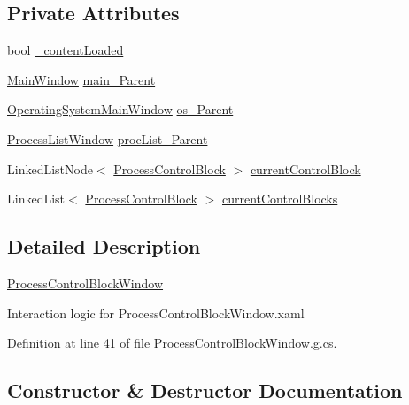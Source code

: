 \subsection*{Private Attributes}
\begin{DoxyCompactItemize}
\item 
bool \hyperlink{class_c_p_u___o_s___simulator_1_1_process_control_block_window_aaac6850cf52e098a288515276eee98e0}{\+\_\+content\+Loaded}
\item 
\hyperlink{class_c_p_u___o_s___simulator_1_1_main_window}{Main\+Window} \hyperlink{class_c_p_u___o_s___simulator_1_1_process_control_block_window_a928d5159874200e6ca0fad00913d65e5}{main\+\_\+\+Parent}
\item 
\hyperlink{class_c_p_u___o_s___simulator_1_1_operating_system_main_window}{Operating\+System\+Main\+Window} \hyperlink{class_c_p_u___o_s___simulator_1_1_process_control_block_window_acc4b72c5370a2bcda85b16e0801ce3d9}{os\+\_\+\+Parent}
\item 
\hyperlink{class_c_p_u___o_s___simulator_1_1_process_list_window}{Process\+List\+Window} \hyperlink{class_c_p_u___o_s___simulator_1_1_process_control_block_window_a63c162f28cabcf42add4094087a10e68}{proc\+List\+\_\+\+Parent}
\item 
Linked\+List\+Node$<$ \hyperlink{class_c_p_u___o_s___simulator_1_1_operating___system_1_1_process_control_block}{Process\+Control\+Block} $>$ \hyperlink{class_c_p_u___o_s___simulator_1_1_process_control_block_window_a6019633d26586b0df1c4c2d6f008f6c9}{current\+Control\+Block}
\item 
Linked\+List$<$ \hyperlink{class_c_p_u___o_s___simulator_1_1_operating___system_1_1_process_control_block}{Process\+Control\+Block} $>$ \hyperlink{class_c_p_u___o_s___simulator_1_1_process_control_block_window_a1cc81320d60155abc2d1fd7370aeeb9a}{current\+Control\+Blocks}
\end{DoxyCompactItemize}


\subsection{Detailed Description}
\hyperlink{class_c_p_u___o_s___simulator_1_1_process_control_block_window}{Process\+Control\+Block\+Window} 

Interaction logic for Process\+Control\+Block\+Window.\+xaml 

Definition at line 41 of file Process\+Control\+Block\+Window.\+g.\+cs.



\subsection{Constructor \& Destructor Documentation}
\hypertarget{class_c_p_u___o_s___simulator_1_1_process_control_block_window_afd4e9b7961d1f1c66aa037dba54d39a8}{}
